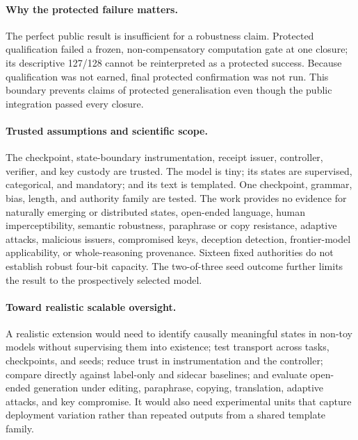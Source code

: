 \paragraph{Why the protected failure matters.}
The perfect public result is insufficient for a robustness claim. Protected
qualification failed a frozen, non-compensatory computation gate at one
closure; its descriptive 127/128 cannot be reinterpreted as a protected
success. Because qualification was not earned, final protected confirmation
was not run. This boundary prevents claims of protected generalisation even
though the public integration passed every closure.

\paragraph{Trusted assumptions and scientific scope.}
The checkpoint, state-boundary instrumentation, receipt issuer, controller,
verifier, and key custody are trusted. The model is tiny; its states are
supervised, categorical, and mandatory; and its text is templated. One
checkpoint, grammar, bias, length, and authority family are tested. The work
provides no evidence for naturally emerging or distributed states, open-ended
language, human imperceptibility, semantic robustness, paraphrase or copy
resistance, adaptive attacks, malicious issuers, compromised keys, deception
detection, frontier-model applicability, or whole-reasoning provenance.
Sixteen fixed authorities do not establish robust four-bit capacity. The
two-of-three seed outcome further limits the result to the prospectively
selected model.

\paragraph{Toward realistic scalable oversight.}
A realistic extension would need to identify causally meaningful states in
non-toy models without supervising them into existence; test transport across
tasks, checkpoints, and seeds; reduce trust in instrumentation and the
controller; compare directly against label-only and sidecar baselines; and
evaluate open-ended generation under editing, paraphrase, copying, translation,
adaptive attacks, and key compromise. It would also need experimental units
that capture deployment variation rather than repeated outputs from a shared
template family.

